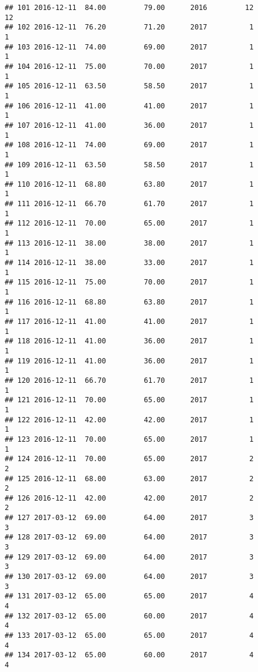 \documentclass[]{article}
\begin{document}
\begin{verbatim}
## 101 2016-12-11  84.00         79.00      2016         12                12
## 102 2016-12-11  76.20         71.20      2017          1                 1
## 103 2016-12-11  74.00         69.00      2017          1                 1
## 104 2016-12-11  75.00         70.00      2017          1                 1
## 105 2016-12-11  63.50         58.50      2017          1                 1
## 106 2016-12-11  41.00         41.00      2017          1                 1
## 107 2016-12-11  41.00         36.00      2017          1                 1
## 108 2016-12-11  74.00         69.00      2017          1                 1
## 109 2016-12-11  63.50         58.50      2017          1                 1
## 110 2016-12-11  68.80         63.80      2017          1                 1
## 111 2016-12-11  66.70         61.70      2017          1                 1
## 112 2016-12-11  70.00         65.00      2017          1                 1
## 113 2016-12-11  38.00         38.00      2017          1                 1
## 114 2016-12-11  38.00         33.00      2017          1                 1
## 115 2016-12-11  75.00         70.00      2017          1                 1
## 116 2016-12-11  68.80         63.80      2017          1                 1
## 117 2016-12-11  41.00         41.00      2017          1                 1
## 118 2016-12-11  41.00         36.00      2017          1                 1
## 119 2016-12-11  41.00         36.00      2017          1                 1
## 120 2016-12-11  66.70         61.70      2017          1                 1
## 121 2016-12-11  70.00         65.00      2017          1                 1
## 122 2016-12-11  42.00         42.00      2017          1                 1
## 123 2016-12-11  70.00         65.00      2017          1                 1
## 124 2016-12-11  70.00         65.00      2017          2                 2
## 125 2016-12-11  68.00         63.00      2017          2                 2
## 126 2016-12-11  42.00         42.00      2017          2                 2
## 127 2017-03-12  69.00         64.00      2017          3                 3
## 128 2017-03-12  69.00         64.00      2017          3                 3
## 129 2017-03-12  69.00         64.00      2017          3                 3
## 130 2017-03-12  69.00         64.00      2017          3                 3
## 131 2017-03-12  65.00         65.00      2017          4                 4
## 132 2017-03-12  65.00         60.00      2017          4                 4
## 133 2017-03-12  65.00         65.00      2017          4                 4
## 134 2017-03-12  65.00         60.00      2017          4                 4

\end{verbatim}
\end{document}
